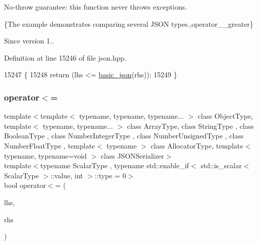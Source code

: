 No-\/throw guarantee\+: this function never throws exceptions.

\{The example demonstrates comparing several J\+S\+ON types.,operator\+\_\+\+\_\+greater\}

\begin{DoxySince}{Since}
version 1.. 
\end{DoxySince}


Definition at line 15246 of file json.\+hpp.


\begin{DoxyCode}
15247     \{
15248         \textcolor{keywordflow}{return} (lhs <= \hyperlink{classnlohmann_1_1basic__json_aed115142bd0c6c66c864700e0467df55}{basic\_json}(rhs));
15249     \}
\end{DoxyCode}
\mbox{\label{classnlohmann_1_1basic__json_ad73f88f70fe5acfa521750a8cd710026}} 
\subsubsection{\texorpdfstring{operator$<$=}{operator<=}\hspace{0.1cm}{\footnotesize\ttfamily [3/3]}}
{\footnotesize\ttfamily template$<$template$<$ typename, typename, typename... $>$ class Object\+Type, template$<$ typename, typename... $>$ class Array\+Type, class String\+Type , class Boolean\+Type , class Number\+Integer\+Type , class Number\+Unsigned\+Type , class Number\+Float\+Type , template$<$ typename $>$ class Allocator\+Type, template$<$ typename, typename=void $>$ class J\+S\+O\+N\+Serializer$>$ \\
template$<$typename Scalar\+Type , typename std\+::enable\+\_\+if$<$ std\+::is\+\_\+scalar$<$ Scalar\+Type $>$\+::value, int $>$\+::type  = 0$>$ \\
bool operator$<$= (\begin{DoxyParamCaption}\item[{const Scalar\+Type}]{lhs,  }\item[{\hyperlink{classnlohmann_1_1basic__json_a4057c5425f4faacfe39a8046871786ca}{const\+\_\+reference}}]{rhs }\end{DoxyParamCaption})\hspace{0.3cm}{\ttfamily [friend]}}



